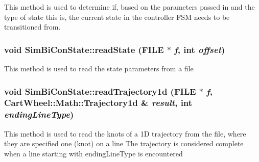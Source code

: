 \label{classCartWheel_1_1Core_1_1SimBiConState_ab81a60307b3864c9db6953a09b8e53c1}
This method is used to determine if, based on the parameters passed in and the type of state this is, the current state in the controller FSM needs to be transitioned from. \hypertarget{classCartWheel_1_1Core_1_1SimBiConState_adea449bfc8a6d005a87b6bb7a8149ceb}{
\subsubsection[{readState}]{\setlength{\rightskip}{0pt plus 5cm}void SimBiConState::readState (FILE $\ast$ {\em f}, \/  int {\em offset})}}
\label{classCartWheel_1_1Core_1_1SimBiConState_adea449bfc8a6d005a87b6bb7a8149ceb}
This method is used to read the state parameters from a file \hypertarget{classCartWheel_1_1Core_1_1SimBiConState_a0549232088e5cb17378e5e76cab36331}{
\subsubsection[{readTrajectory1d}]{\setlength{\rightskip}{0pt plus 5cm}void SimBiConState::readTrajectory1d (FILE $\ast$ {\em f}, \/  {\bf CartWheel::Math::Trajectory1d} \& {\em result}, \/  int {\em endingLineType})}}
\label{classCartWheel_1_1Core_1_1SimBiConState_a0549232088e5cb17378e5e76cab36331}
This method is used to read the knots of a 1D trajectory from the file, where they are specified one (knot) on a line The trajectory is considered complete when a line starting with endingLineType is encountered

